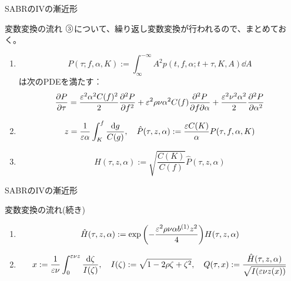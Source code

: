 \documentclass[dvipdfmx,9pt]{beamer}
\begin{document}
\begin{frame}{SABRのIVの漸近形}
  \begin{block}{変数変換の流れ}
    $\raise0.2ex\hbox{\textcircled{\scriptsize{3}}}$について、繰り返し変数変換が行われるので、まとめておく。
    \begin{enumerate}
      \item
            \begin{equation}
              P(\tau ; f,\alpha,K) := \int_{\infty}^{-\infty} A^{2} p(t,f,\alpha ; t + \tau ,K,A) \dd A
            \end{equation}
            は次のPDEを満たす︰
            \begin{equation}
              \pdv{P}{\tau} = \frac{\varepsilon^{2}\alpha^{2}C(f)^{2}}{2}\pdv[2]{P}{f} + \varepsilon^{2} \rho \nu \alpha^{2} C(f) \pdv{P}{f}{\alpha} + \frac{\varepsilon^{2}\nu^{2}\alpha^{2}}{2}\pdv[2]{P}{\alpha}
            \end{equation}
      \item
            \begin{equation}
              z = \frac{1}{\varepsilon\alpha}\int^{f}_{K}\frac{\dd g}{C(g)} , \quad \hat{P}(\tau,z,\alpha) := \frac{\varepsilon C(K)}{\alpha} P(\tau,f,\alpha,K)
            \end{equation}
      \item \begin{equation}
              H(\tau,z,\alpha) := \sqrt{\frac{C(K)}{C(f)}}\hat{P}(\tau,z,\alpha)
            \end{equation}
    \end{enumerate}
  \end{block}
\end{frame}

\begin{frame}{SABRのIVの漸近形}
  \begin{block}{変数変換の流れ(続き)}
    \begin{enumerate}
      \setcounter{enumi}{3}
      \item
            \begin{equation}
              \hat{H}(\tau,z,\alpha) := \expi{-\frac{\ep^{2}\rho\nu\alpha b^{(1)}z^{2}}{4}}H(\tau,z,\alpha)
            \end{equation}
      \item
            \begin{equation}
              x := \frac{1}{\varepsilon\nu}\int_{0}^{\varepsilon\nu z}\frac{\dd \zeta}{I(\zeta)}, \quad
              I(\zeta) := \sqrt{1 - 2\rho\zeta + \zeta^{2}}, \quad
              Q(\tau, x) := \frac{\hat{H}(\tau,z,\alpha)}{\sqrt{I(\varepsilon\nu z(x))}}
            \end{equation}
    \end{enumerate}
  \end{block}
\end{frame}
\end{document}
